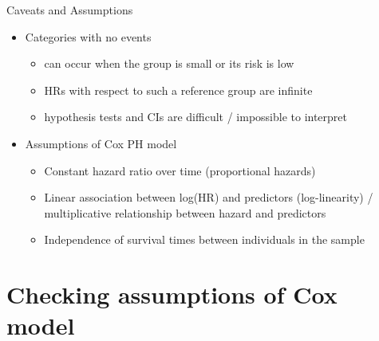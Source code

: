 \documentclass[
  ignorenonframetext,
]{beamer}
\providecommand{\tightlist}{%
  \setlength{\itemsep}{0pt}\setlength{\parskip}{0pt}}
\begin{document}
\begin{frame}{Caveats and Assumptions}
\protect\hypertarget{caveats-and-assumptions}{}

\begin{itemize}
\tightlist
\item
  Categories with no events

  \begin{itemize}
  \tightlist
  \item
    can occur when the group is small or its risk is low
  \item
    HRs with respect to such a reference group are infinite
  \item
    hypothesis tests and CIs are difficult / impossible to interpret
  \end{itemize}
\item
  Assumptions of Cox PH model

  \begin{itemize}
  \tightlist
  \item
    Constant hazard ratio over time (proportional hazards)
  \item
    Linear association between log(HR) and predictors (log-linearity) /
    multiplicative relationship between hazard and predictors
  \item
    Independence of survival times between individuals in the sample
  \end{itemize}
\end{itemize}

\end{frame}

\hypertarget{checking-assumptions-of-cox-model}{%
\section{Checking assumptions of Cox
model}\label{checking-assumptions-of-cox-model}}
\end{document}
